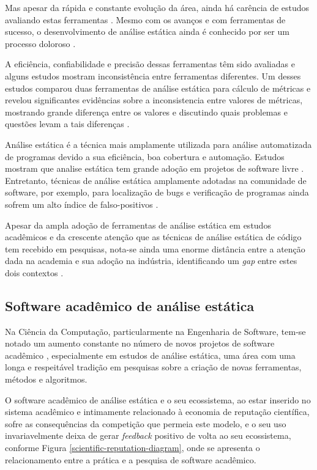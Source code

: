 Mas apesar da rápida e constante evolução da área, ainda há carência de estudos
avaliando estas ferramentas \cite{li2010comparative}. Mesmo com os avanços e com
ferramentas de sucesso, o desenvolvimento de análise estática ainda é conhecido
por ser um processo doloroso \cite{toman2017taming}.

A eficiência, confiabilidade e precisão dessas ferramentas têm sido avaliadas e
alguns estudos mostram inconsistência entre ferramentas diferentes.  Um desses
estudos comparou duas ferramentas de análise estática para cálculo de métricas
e revelou significantes evidências sobre a inconsistencia entre valores de
métricas, mostrando grande diferença entre os valores e discutindo quais
problemas e questões levam a tais diferenças \cite{alemerien2013experimental}.

Análise estática é a técnica mais amplamente utilizada para análise
automatizada de programas devido a sua eficiência, boa cobertura e automação.
Estudos mostram que analise estática tem grande adoção em projetos de software
livre \cite{beller2016analyzing}.
Entretanto, técnicas de análise estática amplamente adotadas na comunidade de software,
por exemplo, para localização de bugs e verificação de programas 
ainda sofrem um alto índice de falso-positivos \cite{gosain2015static}.

Apesar da ampla adoção de ferramentas de análise estática em estudos
acadêmicos e da crescente atenção que as técnicas de análise estática de código tem
recebido em pesquisas, nota-se ainda uma enorme distância entre a atenção dada na academia e sua adoção na indústria,
identificando um {\it gap} entre estes dois contextos \cite{ilyas2016static}.

\subsection{Software acadêmico de análise estática}

Na Ciência da Computação, particularmente na Engenharia de Software, tem-se
notado um aumento constante no número de novos projetos de software acadêmico \cite{allen2017engineering},
especialmente em estudos de análise estática, 
uma área com uma longa e respeitável tradição em
pesquisas sobre a criação de novas ferramentas, métodos e algoritmos.

O software acadêmico de análise estática e o seu ecossistema, ao estar inserido
no sistema acadêmico e intimamente relacionado à economia de reputação
científica, sofre as consequências da competição que permeia este modelo, e o
seu uso invariavelmente deixa de gerar {\it feedback} positivo de volta ao seu ecossistema,
conforme Figura \ref{scientific-reputation-diagram}, onde se apresenta o
relacionamento entre a prática e a pesquisa de software acadêmico.

